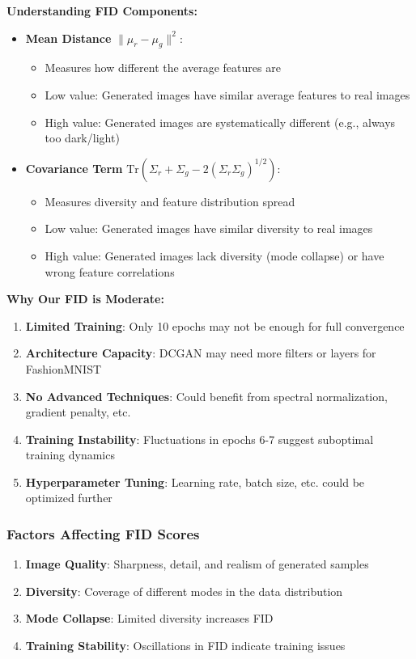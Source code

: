 \documentclass[conference,12pt]{IEEEtran}
\begin{document}
\textbf{Understanding FID Components:}
\begin{itemize}
    \item \textbf{Mean Distance} $\|\mu_r - \mu_g\|^2$:
    \begin{itemize}
        \item Measures how different the average features are
        \item Low value: Generated images have similar average features to real images
        \item High value: Generated images are systematically different (e.g., always too dark/light)
    \end{itemize}
    \item \textbf{Covariance Term} $\text{Tr}(\Sigma_r + \Sigma_g - 2(\Sigma_r \Sigma_g)^{1/2})$:
    \begin{itemize}
        \item Measures diversity and feature distribution spread
        \item Low value: Generated images have similar diversity to real images
        \item High value: Generated images lack diversity (mode collapse) or have wrong feature correlations
    \end{itemize}
\end{itemize}

\textbf{Why Our FID is Moderate:}
\begin{enumerate}
    \item \textbf{Limited Training}: Only 10 epochs may not be enough for full convergence
    \item \textbf{Architecture Capacity}: DCGAN may need more filters or layers for FashionMNIST
    \item \textbf{No Advanced Techniques}: Could benefit from spectral normalization, gradient penalty, etc.
    \item \textbf{Training Instability}: Fluctuations in epochs 6-7 suggest suboptimal training dynamics
    \item \textbf{Hyperparameter Tuning}: Learning rate, batch size, etc. could be optimized further
\end{enumerate}

\subsubsection{Factors Affecting FID Scores}

\begin{enumerate}
    \item \textbf{Image Quality}: Sharpness, detail, and realism of generated samples
    \item \textbf{Diversity}: Coverage of different modes in the data distribution
    \item \textbf{Mode Collapse}: Limited diversity increases FID
    \item \textbf{Training Stability}: Oscillations in FID indicate training issues
\end{enumerate}
\end{document}
